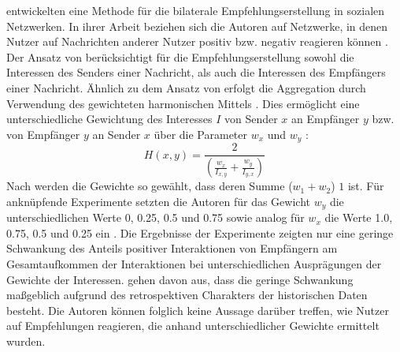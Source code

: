 \textcite[S. 247ff.]{kim:2:inproceedings} entwickelten eine Methode für die bilaterale Empfehlungserstellung in sozialen Netzwerken.
In ihrer Arbeit beziehen sich die Autoren auf Netzwerke, in denen Nutzer auf Nachrichten anderer Nutzer positiv bzw. negativ reagieren können \cite[S. 548]{koprinska:inbook}.
Der Ansatz von \textcite[S. 247ff.]{kim:2:inproceedings} berücksichtigt für die Empfehlungserstellung sowohl die Interessen des Senders einer Nachricht, als auch die Interessen des Empfängers einer Nachricht.
Ähnlich zu dem Ansatz von \textcite[S. 207ff.]{pizzato:2010} erfolgt die Aggregation durch Verwendung des gewichteten harmonischen Mittels \cite[S. 251]{kim:2:inproceedings}.
Dies ermöglicht eine unterschiedliche Gewichtung des Interesses $I$ von Sender $x$ an Empfänger $y$ bzw. von Empfänger $y$ an Sender $x$ über die Parameter $w_{x}$ und $w_{y}$ \cite[S. 251]{kim:2:inproceedings}:
\begin{equation}\label{eq34}
    H(x,y) = \frac{2}{(\frac{w_{x}}{I_{x,y}}+\frac{w_{y}}{I_{y,x}})}
\end{equation}
Nach \textcite[S. 219]{kim:2:inproceedings} werden die Gewichte so gewählt, dass deren Summe ($w_{1}+w_{2}$) $1$ ist.
Für anknüpfende Experimente setzten die Autoren für das Gewicht $w_{y}$ die unterschiedlichen Werte 0, 0.25, 0.5 und 0.75 sowie analog für $w_{x}$ die Werte 1.0, 0.75, 0.5 und 0.25 ein \cite[S. 251]{kim:2:inproceedings}.
Die Ergebnisse der Experimente zeigten nur eine geringe Schwankung des Anteils positiver Interaktionen von Empfängern am Gesamtaufkommen der Interaktionen bei unterschiedlichen Ausprägungen der Gewichte der Interessen.
\textcite[S. 259]{kim:2:inproceedings} gehen davon aus, dass die geringe Schwankung maßgeblich aufgrund des retrospektiven Charakters der historischen Daten besteht.
Die Autoren können folglich keine Aussage darüber treffen, wie Nutzer auf Empfehlungen reagieren, die anhand unterschiedlicher Gewichte ermittelt wurden.

